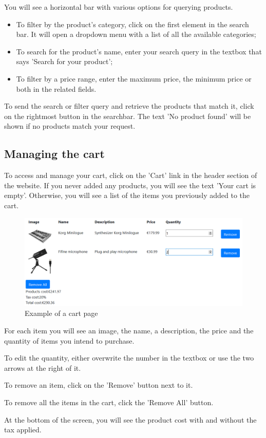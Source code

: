 You will see a horizontal bar with various options for querying products.

\begin{itemize}
\item To filter by the product's category, click on the first element in the search bar. It will open a dropdown menu with a list of all the available categories;
\item To search for the product's name, enter your search query in the textbox that says 'Search for your product';
\item To filter by a price range, enter the maximum price, the minimum price or both in the related fields.
\end{itemize}

To send the search or filter query and retrieve the products that match it, click on the rightmost button in the searchbar. The text 'No product found' will be shown if no products match your request.

\subsection{Managing the cart}
To access and manage your cart, click on the 'Cart' link in the header section of the website. If you never added any products, you will see the text 'Your cart is empty'. Otherwise, you will see a list of the items you previously added to the cart.

\begin{figure}[H]
\centering
\includegraphics[scale=0.6]{res/Immagini/CartPage}
\caption{Example of a cart page}
\end{figure}

For each item you will see an image, the name, a description, the price and the quantity of items you intend to purchase.

To edit the quantity, either overwrite the number in the textbox or use the two arrows at the right of it. 

To remove an item, click on the 'Remove' button next to it. 

To remove all the items in the cart, click the 'Remove All' button.

At the bottom of the screen, you will see the product cost with and without the tax applied.